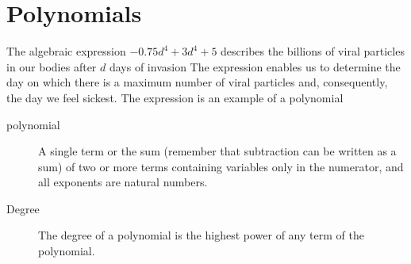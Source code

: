 \section{Polynomials}
%
The algebraic \gls{expression} $-0.75d^4+3d^4+5$ describes the billions of viral particles in 
our bodies after $d$ days of invasion
	The expression enables us to determine the day on which there is a maximum
	number of viral particles and, consequently, the day we feel sickest.
	The expression is an example of a \gls{polynomial}

\begin{myDefinition}
	\begin{description}
		\item[polynomial] A single term or the sum (remember that subtraction can be written as a sum) of two or
		more terms containing variables only in the numerator, and all exponents are natural numbers.
		\item[Degree] The \gls{degree} of a polynomial is the highest power of any term of the polynomial.  
	\end{description}
		 
\end{myDefinition}


